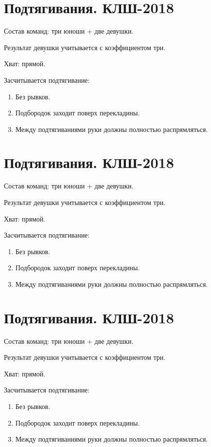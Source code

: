 \documentclass[11pt,russian,]{article}
\title{}
\author{}
\date{}
\begin{document}
\section{Подтягивания. КЛШ-2018}\label{.--2018}

Состав команд: три юноши + две девушки.

Результат девушки учитывается с коэффициентом три.

Хват: прямой.

Засчитывается подтягивание:

\begin{enumerate}
\def\labelenumi{\arabic{enumi}.}
\item
  Без рывков.
\item
  Подбородок заходит поверх перекладины.
\item
  Между подтягиваниями руки должны полностью распрямляться.
\end{enumerate}

\section{Подтягивания. КЛШ-2018}\label{.--2018-1}

Состав команд: три юноши + две девушки.

Результат девушки учитывается с коэффициентом три.

Хват: прямой.

Засчитывается подтягивание:

\begin{enumerate}
\def\labelenumi{\arabic{enumi}.}
\item
  Без рывков.
\item
  Подбородок заходит поверх перекладины.
\item
  Между подтягиваниями руки должны полностью распрямляться.
\end{enumerate}

\section{Подтягивания. КЛШ-2018}\label{.--2018-2}

Состав команд: три юноши + две девушки.

Результат девушки учитывается с коэффициентом три.

Хват: прямой.

Засчитывается подтягивание:

\begin{enumerate}
\def\labelenumi{\arabic{enumi}.}
\item
  Без рывков.
\item
  Подбородок заходит поверх перекладины.
\item
  Между подтягиваниями руки должны полностью распрямляться.
\end{enumerate}
\end{document}
